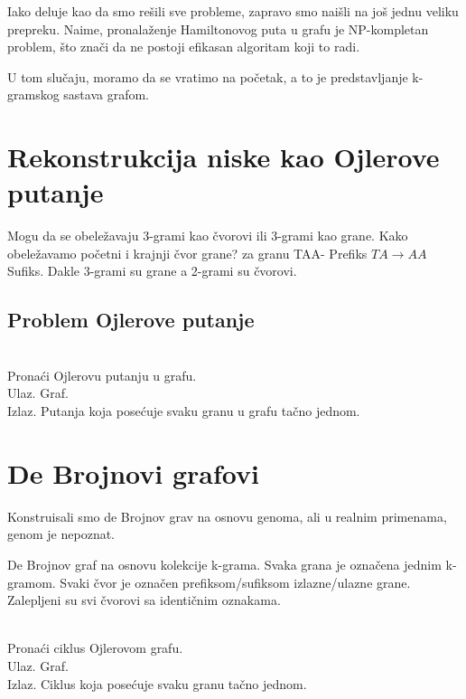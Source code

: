 Iako deluje kao da smo rešili sve probleme, zapravo smo naišli na još jednu veliku prepreku. Naime, pronalaženje Hamiltonovog puta u grafu je NP-kompletan problem, što znači da ne postoji efikasan algoritam koji to radi.

U tom slučaju, moramo da se vratimo na početak, a to je predstavljanje k-gramskog sastava grafom.


\section{Rekonstrukcija niske kao Ojlerove putanje}

Mogu da se obeležavaju 3-grami kao čvorovi ili 3-grami kao grane. Kako obeležavamo početni i krajnji čvor grane?
za granu TAA- Prefiks $TA\rightarrow AA$ Sufiks. Dakle 3-grami su grane a 2-grami su čvorovi.


\subsection{Problem Ojlerove putanje}

\begin{problem}
	~\\ Pronaći Ojlerovu putanju u grafu.
	\\ Ulaz. Graf.
	\\ Izlaz. Putanja koja posećuje svaku granu u grafu tačno jednom.
\end{problem}

\section{De Brojnovi grafovi}

Konstruisali smo de Brojnov grav na osnovu genoma, ali u realnim primenama, genom je nepoznat.



De Brojnov graf na osnovu kolekcije k-grama.
Svaka grana je označena jednim k-gramom. Svaki čvor je označen prefiksom/sufiksom izlazne/ulazne grane. Zalepljeni su svi čvorovi sa identičnim oznakama.

\begin{problem}
	~\\ Pronaći ciklus Ojlerovom grafu.
	\\ Ulaz. Graf.
	\\ Izlaz. Ciklus koja posećuje svaku granu tačno jednom.
\end{problem}

